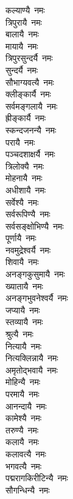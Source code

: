 \begin{flushleft}
\begin{multicols}{2}
कल्याण्यै~नमः\\
त्रिपुरायै~नमः\\
बालायै~नमः\\
मायायै~नमः\\
त्रिपुरसुन्दर्यै~नमः\\
सुन्दर्यै~नमः\\
सौभाग्यवत्यै~नमः\\
क्लीङ्कार्यै~नमः\\
सर्वमङ्गलायै~नमः\\
ह्रीङ्कार्यै~नमः\hfill{}\\
स्कन्दजनन्यै~नमः\\
परायै~नमः\\
पञ्चदशाक्षर्यै~नमः\\
त्रिलोक्यै~नमः\\
मोहनायै~नमः\\
अधीशायै~नमः\\
सर्वेश्यै~नमः\\
सर्वरूपिण्यै~नमः\\
सर्वसङ्क्षोभिण्यै~नमः\\
पूर्णायै~नमः\hfill{}\\
नवमुद्रेश्वर्यै~नमः\\
शिवायै~नमः\\
अनङ्गकुसुमायै~नमः\\
ख्यातायै~नमः\\
अनङ्गभुवनेश्वर्यै~नमः\\
जप्यायै~नमः\\
स्तव्यायै~नमः\\
श्रुत्यै~नमः\\
नित्यायै~नमः\\
नित्यक्लिन्नायै~नमः\hfill{}\\
अमृतोद्भवायै~नमः\\
मोहिन्यै~नमः\\
परमायै~नमः\\
आनन्दायै~नमः\\
कामेश्यै~नमः\\
तरुण्यै~नमः\\
कलायै~नमः\\
कलावत्यै~नमः\\
भगवत्यै~नमः\\
पद्मरागकिरीटिन्यै~नमः\hfill{}\\
सौगन्धिन्यै~नमः\\

\end{multicols}
\end{flushleft}
